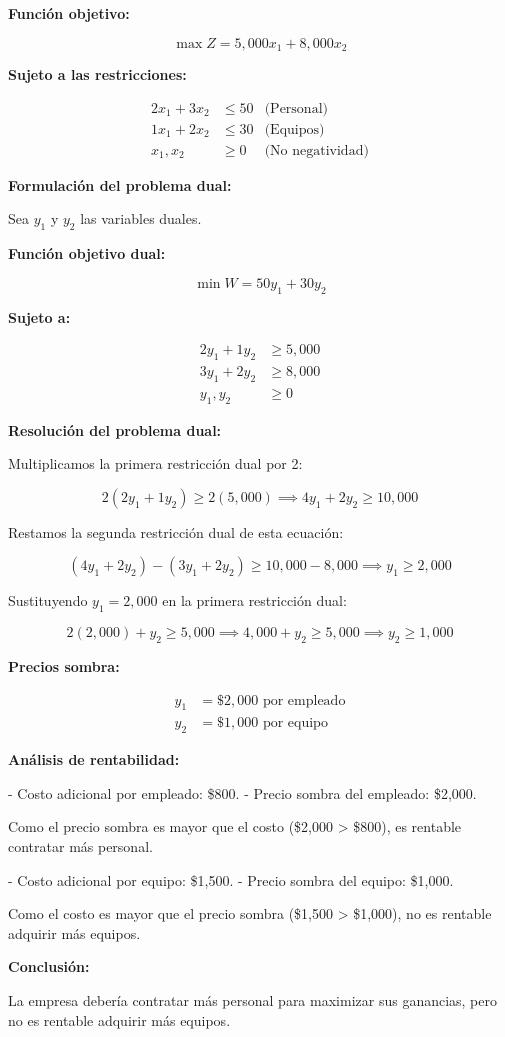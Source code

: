 \documentclass{article}
\begin{document}
\begin{multicols}{2}
\textbf{Función objetivo:}

\[
\max Z = 5,000x_1 + 8,000x_2
\]

\textbf{Sujeto a las restricciones:}

\[
\begin{aligned}
2x_1 + 3x_2 &\leq 50 & \text{(Personal)} \\
1x_1 + 2x_2 &\leq 30 & \text{(Equipos)} \\
x_1, x_2 &\geq 0 & \text{(No negatividad)}
\end{aligned}
\]

\textbf{Formulación del problema dual:}

Sea \( y_1 \) y \( y_2 \) las variables duales.

\textbf{Función objetivo dual:}

\[
\min W = 50y_1 + 30y_2
\]

\textbf{Sujeto a:}

\[
\begin{aligned}
2y_1 + 1y_2 &\geq 5,000 \\
3y_1 + 2y_2 &\geq 8,000 \\
y_1, y_2 &\geq 0
\end{aligned}
\]
\end{multicols}

\textbf{Resolución del problema dual:}

Multiplicamos la primera restricción dual por 2:

\[
2(2y_1 + 1y_2) \geq 2(5,000) \implies 4y_1 + 2y_2 \geq 10,000
\]

Restamos la segunda restricción dual de esta ecuación:

\[
(4y_1 + 2y_2) - (3y_1 + 2y_2) \geq 10,000 - 8,000 \implies y_1 \geq 2,000
\]

Sustituyendo \( y_1 = 2,000 \) en la primera restricción dual:

\[
2(2,000) + y_2 \geq 5,000 \implies 4,000 + y_2 \geq 5,000 \implies y_2 \geq 1,000
\]

\textbf{Precios sombra:}

\[
\begin{aligned}
y_1 &= \$2,000 \text{ por empleado} \\
y_2 &= \$1,000 \text{ por equipo}
\end{aligned}
\]

\textbf{Análisis de rentabilidad:}

- Costo adicional por empleado: \$800.
- Precio sombra del empleado: \$2,000.

Como el precio sombra es mayor que el costo (\$2,000 > \$800), es rentable contratar más personal.

- Costo adicional por equipo: \$1,500.
- Precio sombra del equipo: \$1,000.

Como el costo es mayor que el precio sombra (\$1,500 > \$1,000), no es rentable adquirir más equipos.

\textbf{Conclusión:}

La empresa debería contratar más personal para maximizar sus ganancias, pero no es rentable adquirir más equipos.
\end{document}

